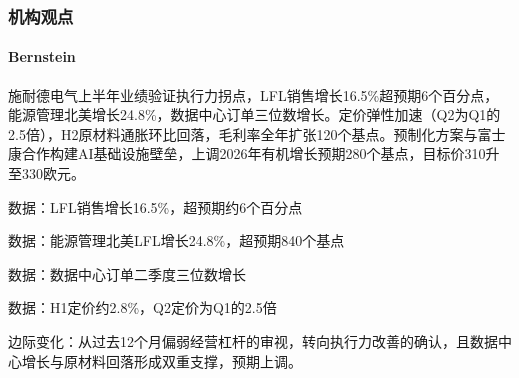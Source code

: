 \documentclass[11pt]{ctexart}
\begin{document}
\subsubsection*{机构观点}
\paragraph{Bernstein} 施耐德电气上半年业绩验证执行力拐点，LFL销售增长16.5\%超预期6个百分点，能源管理北美增长24.8\%，数据中心订单三位数增长。定价弹性加速（Q2为Q1的2.5倍），H2原材料通胀环比回落，毛利率全年扩张120个基点。预制化方案与富士康合作构建AI基础设施壁垒，上调2026年有机增长预期280个基点，目标价310升至330欧元。
{\small\color{refgray}数据：LFL销售增长16.5\%，超预期约6个百分点\par}
{\small\color{refgray}数据：能源管理北美LFL增长24.8\%，超预期840个基点\par}
{\small\color{refgray}数据：数据中心订单二季度三位数增长\par}
{\small\color{refgray}数据：H1定价约2.8\%，Q2定价为Q1的2.5倍\par}
{\small\color{refgray}边际变化：从过去12个月偏弱经营杠杆的审视，转向执行力改善的确认，且数据中心增长与原材料回落形成双重支撑，预期上调。\par}
\end{document}
